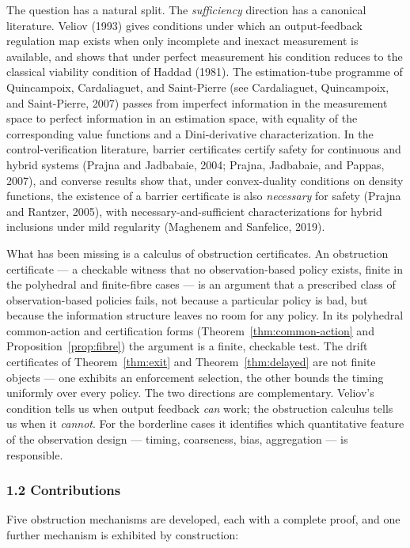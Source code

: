 \documentclass[11pt]{article}
\theoremstyle{definition}
\begin{document}
The question has a natural split. The \emph{sufficiency} direction has a
canonical literature. Veliov (1993) gives conditions under which an
output-feedback regulation map exists when only incomplete and inexact
measurement is available, and shows that under perfect measurement his
condition reduces to the classical viability condition of Haddad (1981).
The estimation-tube programme of Quincampoix, Cardaliaguet, and
Saint-Pierre (see Cardaliaguet, Quincampoix, and Saint-Pierre, 2007)
passes from imperfect information in the measurement space to perfect
information in an estimation space, with equality of the corresponding
value functions and a Dini-derivative characterization. In the
control-verification literature, barrier certificates certify safety for
continuous and hybrid systems (Prajna and Jadbabaie, 2004; Prajna,
Jadbabaie, and Pappas, 2007), and converse results show that, under convex-duality conditions on density functions, the existence of a
barrier certificate is also \emph{necessary} for safety (Prajna and
Rantzer, 2005), with necessary-and-sufficient characterizations for
hybrid inclusions under mild regularity (Maghenem and Sanfelice, 2019).

What has been missing is a calculus of obstruction certificates. An obstruction certificate --- a checkable witness that no observation-based policy exists, finite in the polyhedral and finite-fibre cases --- is an argument that a prescribed class of observation-based policies fails, not because a particular policy is bad, but because the information structure leaves no room for any policy. In its polyhedral common-action and certification forms
(Theorem~\ref{thm:common-action} and Proposition~\ref{prop:fibre}) the argument is a finite, checkable test. The drift
certificates of Theorem~\ref{thm:exit} and Theorem~\ref{thm:delayed} are not finite objects --- one exhibits
an enforcement selection, the other bounds the timing uniformly over every policy. The two directions are
complementary. Veliov's condition tells us when output feedback
\emph{can} work; the obstruction calculus tells us when it
\emph{cannot}. For the borderline cases it identifies which quantitative
feature of the observation design --- timing, coarseness, bias,
aggregation --- is responsible.

\subsubsection{1.2 Contributions}\label{contributions}

Five obstruction mechanisms are developed, each with a complete proof,
and one further mechanism is exhibited by construction:
\end{document}
